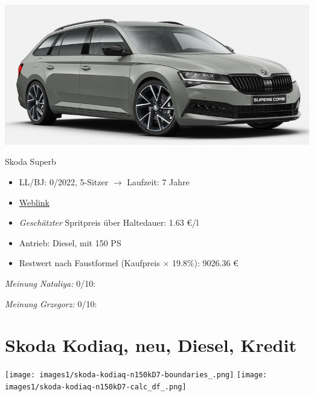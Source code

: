 \documentclass[landscape, DIV=99, 14pt]{scrartcl}
\begin{document}
\pagebreak
\begin{center}
\includegraphics[width=0.9\columnwidth]{cars/skoda-superb-neu.png}

Skoda Superb
\end{center}

\begin{itemize}
    \item LL/BJ: 0/2022, 5-Sitzer $\rightarrow$ Laufzeit: 7 Jahre
    \item \href{https://cc.skoda-auto.com/deu/de-DE/summary-scenic?activePage=trimlines&color=M3M3&configurationId=C7JJPPH3&extraEquipments=MKSUKA2%7CMEPH7X2%7CGPB5PB5%7CGWD6WD6%7CGWD3WD3%7CGYOZYOZ&id=DEU%3Bskoda%3B2022%3B3V5R4D%3B1%3BMSNRSI1%5CGYO2YO2%3Bmda20220204020232%3Bde-DE%3B%3B63504%3B63564&interior=EX&modifiedPages=&snapshotVersion=e7313c2a-56a9-4fca-9893-113f5d9c9495&trimline=3VR%7CSportline6356463504&visitedPages=}{Weblink}
    \item \emph{Gesch\"atzter} Spritpreis \"uber Haltedauer: 1.63 \euro{}/l
    \item Antrieb: Diesel, mit 150 PS
    \item Restwert nach Faustformel (Kaufpreis $\times$ 19.8\%): 9026.36 \euro{}
\end{itemize}

\begin{small}
\emph{Meinung Nataliya:} 0/10: 
        
\emph{Meinung Grzegorz:} 0/10: 
\end{small}

\pagebreak


\twocolumn

\section*{Skoda Kodiaq, neu, Diesel, Kredit}
\begin{center}
\texttt{[image: images1/skoda-kodiaq-n150kD7-boundaries\_.png]}
\null
\vspace{0.5cm}
\texttt{[image: images1/skoda-kodiaq-n150kD7-calc\_df\_.png]}
\end{center}
\end{document}
